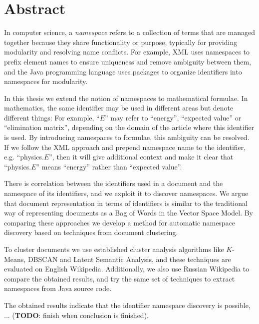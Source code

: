\section*{Abstract}


In computer science, a \emph{namespace} refers to a collection of 
terms that are managed together because they share functionality or 
purpose, typically for providing modularity and resolving name conflicts. 
For example, XML uses namespaces to prefix element names to ensure uniqueness 
and remove ambiguity between them, and the Java programming language uses 
packages to organize identifiers into namespaces for modularity.

In this thesis we extend the notion of namespaces to mathematical formulae.
In mathematics, the same identifier may be used in different areas 
but denote different things: For example, ``$E$'' may refer to ``energy'', 
``expected value'' or ``elimination matrix'', depending on the domain of the article 
where this identifier is used. By introducing namespaces to 
formulae, this ambiguity can be resolved. If we follow the XML approach
and prepend namespace name to the identifier, e.g. ``physics.$E$'', then it 
will give additional context and make it clear that ``physics.$E$'' means ``energy''
rather than ``expected value''.

There is correlation between  the identifiers used in a document and
the namespace of its identifiers, and we exploit it to discover namespaces.
We argue that document representation in terms of identifiers is 
similar to the traditional way of representing documents as a Bag of Words
in the Vector Space Model. By comparing these approaches we 
develop a method for automatic namespace discovery based on techniques from 
document clustering. 

To cluster documents we use established cluster analysis algorithms like 
$K$-Means, DBSCAN and Latent Semantic Analysis, and these techniques 
are evaluated on English Wikipedia. Additionally, we also use Russian 
Wikipedia to compare the obtained results, and try the same set of 
techniques to extract namespaces from Java source code.

The obtained results indicate that the identifier namespace discovery is 
possible, ... (\textbf{TODO}: finish when conclusion is finished).
